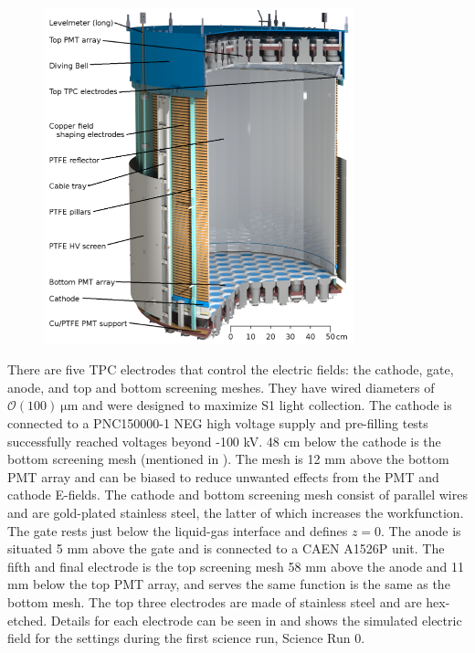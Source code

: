 \begin{figure}
\centering
\includegraphics[width=0.8\textwidth]{XENON1TTPC}
\label{fig:xenon1t_tpc_tpc}
\end{figure}

There are five TPC electrodes that control the electric fields: the cathode, gate, anode, and top and bottom screening meshes.  They have
wired diameters of $\mathcal{O}(100)\ \mathrm{\mu m}$ and were designed to maximize S1 light collection.  The cathode is connected to a
PNC150000-1 NEG high voltage supply and pre-filling tests successfully reached voltages beyond -100 kV.  48
cm below the cathode is the bottom screening mesh (mentioned in ).  The mesh is 12 mm above the bottom PMT
array and can be biased to reduce unwanted effects from the PMT and cathode E-fields.  The cathode and bottom screening mesh consist of
parallel wires and are gold-plated stainless steel, the latter of which increases the workfunction.  The gate rests just below the
liquid-gas interface and defines $z = 0$.  The anode is
situated 5 mm above the gate and is connected to a CAEN A1526P unit.  The fifth and final electrode is the top screening mesh 58 mm above
the anode and 11 mm below the top PMT array, and serves the same function is the same as the bottom mesh.  The top three electrodes are
made of stainless steel and are hex-etched.  Details for each electrode can be seen in  and
 shows the simulated electric field for the settings during the first science run, Science Run 0.

